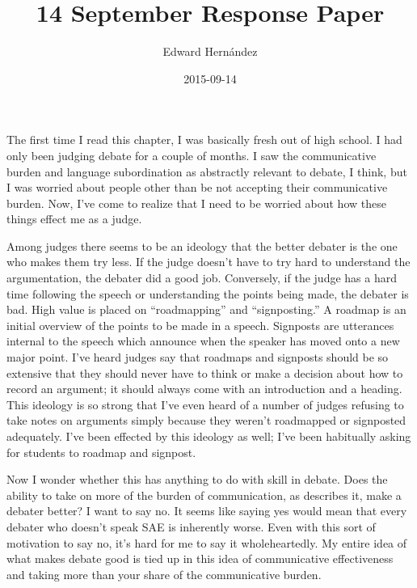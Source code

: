 \documentclass[man,12pt,natbib]{apa6}
\begin{document}
\title{14 September Response Paper}
\author{Edward Hern\'{a}ndez}
\date{2015-09-14}
\maketitle

The first time I read this chapter, I was basically fresh out of high school. I
had only been judging debate for a couple of months. I saw the communicative
burden and language subordination as abstractly relevant to debate, I think,
but I was worried about people other than be not accepting their communicative
burden. Now, I've come to realize that I need to be worried about how these
things effect me as a judge. 

Among judges there seems to be an ideology that the better debater is the one
who makes them try less. If the judge doesn't have to try hard to understand
the argumentation, the debater did a good job. Conversely, if the judge has a
hard time following the speech or understanding the points being made, the
debater is bad. High value is placed on “roadmapping” and “signposting.” A
roadmap is an initial overview of the points to be made in a speech. Signposts
are utterances internal to the speech which announce when the speaker has moved
onto a new major point. I've heard judges say that roadmaps and signposts
should be so extensive that they should never have to think or make a decision
about how to record an argument; it should always come with an introduction and
a heading. This ideology is so strong that I've even heard of a number of
judges refusing to take notes on arguments simply because they weren't
roadmapped or signposted adequately. I've been effected by this ideology as
well; I've been habitually asking for students to roadmap and signpost. 

Now I wonder whether this has anything to do with skill in debate.  Does the
ability to take on more of the burden of communication, as
\citet{Lippi-Green11} describes it, make a debater better? 
I want to say no. It seems like saying yes would mean that every debater who
doesn't speak SAE is inherently worse. Even with this sort of motivation to say
no, it's hard for me to say it wholeheartedly. My entire idea of what makes
debate good is tied up in this idea of communicative effectiveness and taking
more than your share of the communicative burden.
\end{document}
